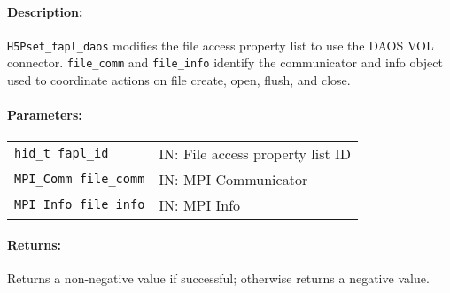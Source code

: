 \paragraph{Description:}
\begin{flushleft}%
\texttt{H5Pset\_fapl\_daos} modifies the file access property list to use the
DAOS VOL connector. \texttt{file\_comm} and
\texttt{file\_info} identify the communicator and info object used to
coordinate actions on file create, open, flush, and close.
\end{flushleft}%

\paragraph{Parameters:}
\begin{flushleft}%
 \begin{tabular}{ll}%
   \texttt{hid\_t fapl\_id} & IN: File access property list ID \\
   \texttt{MPI\_Comm file\_comm} & IN: MPI Communicator \\
   \texttt{MPI\_Info file\_info} & IN: MPI Info \\
 \end{tabular}%
\end{flushleft}%

\paragraph{Returns:}
\begin{flushleft}%
Returns a non-negative value if successful; otherwise returns a negative value.
\end{flushleft}%

